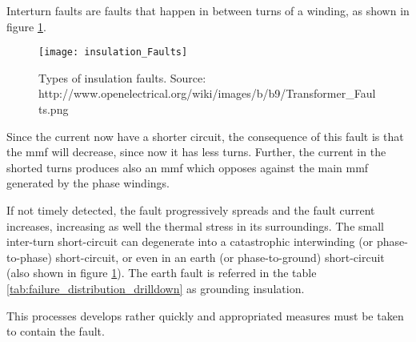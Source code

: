 Interturn faults are faults that happen in between turns of a winding, as shown in figure \ref{fig:insulation_faults}.

\begin{figure}[htbp]
	\centering
	\texttt{[image: insulation\_Faults]}
	\caption{Types of insulation faults. Source: http://www.openelectrical.org/wiki/images/b/b9/Transformer\_Faults.png}
	\label{fig:insulation_faults}
\end{figure}

Since the current now have a shorter circuit, the consequence of this fault is that the \acrfull{mmf} will decrease, since now it has less turns. Further, the current in the shorted turns produces also an \acrshort{mmf} which opposes against the main \acrshort{mmf} generated by the phase windings.


If not timely detected, the fault progressively spreads and the fault current increases, increasing as well the thermal stress in its surroundings. The small inter-turn short-circuit can degenerate into a catastrophic interwinding (or phase-to-phase) short-circuit, or even in an earth (or phase-to-ground) short-circuit (also shown in figure \ref{fig:insulation_faults}). The earth fault is referred in the table \ref{tab:failure_distribution_drilldown} as grounding insulation.

This processes develops rather quickly and appropriated measures must be taken to contain the fault.